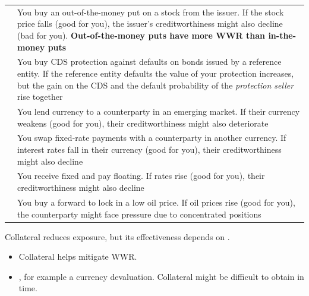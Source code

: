 \begin{center}
\footnotesize
\begin{tabular}{L{3.3cm} L{11.2cm}}
\toprule
{} &  \\
\midrule
{} & You buy an out-of-the-money put on a stock from the
  issuer. If the stock price falls (good for you), the issuer's creditworthiness
  might also decline (bad for you). \textbf{Out-of-the-money puts have more WWR
  than in-the-money puts} \\
 & You buy CDS protection against defaults on bonds
  issued by a reference entity. If the reference entity defaults the value of
  your protection increases, but the gain on the CDS and the default probability
  of the \emph{protection seller} rise together \\
 & You lend currency to a counterparty in an
  emerging market. If their currency weakens (good for you), their
  creditworthiness might also deteriorate \\
 & You swap fixed-rate payments with a counterparty
  in another currency. If interest rates fall in their currency (good for you),
  their creditworthiness might also decline \\
 & You receive fixed and pay floating. If rates rise
  (good for you), their creditworthiness might also decline \\
 & You buy a forward to lock in a low oil price. If oil
  prices rise (good for you), the counterparty might face pressure due to
  concentrated positions \\
\bottomrule
\end{tabular}
\end{center}


Collateral reduces exposure, but its effectiveness depends on .

\begin{itemize}
\item {} Collateral helps mitigate WWR.
\item {}, for example a currency devaluation. Collateral
might be difficult to obtain in time.
\end{itemize}

